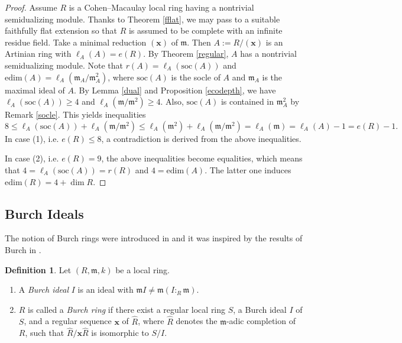\documentclass{amsart}
\newcommand{\m}{\mathfrak{m}}
\theoremstyle{plain}
\theoremstyle{definition}
\newtheorem{definition}[theorem]{Definition}
\numberwithin{theorem}{section}
\numberwithin{equation}{section}
\numberwithin{equation}{theorem}
\begin{document}
\begin{proof}
Assume $R$ is a Cohen--Macaulay local ring having a nontrivial semidualizing module.
Thanks to Theorem \ref{fflat}, we may pass to a suitable faithfully flat extension so that $R$ is assumed to be complete with an infinite residue field.
Take a minimal reduction $(\mathbf{x})$ of $\mathfrak{m}$.
Then $A:=R/(\mathbf{x})$ is an Artinian ring with  $\ell_A(A)=e(R)$.
By Theorem \ref{regular}, $A$ has a nontrivial semidualizing module.
Note that $r(A)=\ell_A(\mathrm{soc}(A))$ and $\mathrm{edim}(A)=\ell_A(\mathfrak{m}_A/\mathfrak{m}_A^2)$, where $\mathrm{soc}(A)$ is the socle of $A$ and $\mathfrak{m}_A$ is the maximal ideal of $A$.
By Lemma \ref{dual} and Proposition \ref{ecodepth}, we have $\ell_A(\mathrm{soc}(A)) \ge 4$ and $\ell_A(\mathfrak{m}/\mathfrak{m}^2)\ge 4$.
Also, $\mathrm{soc}(A)$ is contained in $\mathfrak{m}_A^2$ by Remark \ref{socle}.
This yields inequalities
\[
8 \le \ell_A(\mathrm{soc}(A))+\ell_A(\mathfrak{m}/\mathfrak{m}^2) \le \ell_A(\mathfrak{m}^2)+\ell_A(\mathfrak{m}/\mathfrak{m}^2) = \ell_A(\mathfrak{m})=\ell_A(A)-1=e(R)-1.
\]
In case (1), i.e. $e(R)\le 8$, a contradiction is derived from the above inequalities.

In case (2), i.e. $e(R)=9$, the above inequalities become equalities, which means that $4=\ell_A(\mathrm{soc}(A))=r(R)$ and $4=\mathrm{edim}(A)$.
The latter one induces $\mathrm{edim}(R)=4+\dim R$.
\end{proof}

\subsection{Burch Ideals} 

The notion of Burch rings were introduced in \cite{DKT} and it was inspired by the results of Burch in \cite{B}.  

\begin{definition} \label{defburch}
Let $(R, \m , k)$ be a local ring.
\begin{enumerate}[ \rm(1)]
\item A \emph{Burch ideal} $I$ is an ideal with $\m I \neq \m(I:_R \m)$.
\item $R$ is called a \emph{Burch ring} if there exist a regular local ring $S$, a Burch ideal $I$ of $S$, and a regular sequence $\mathbf{x}$ of $\widehat{R}$, where $\widehat{R}$ denotes the $\m$-adic completion of $R$, such that $\widehat{R}/\mathbf{x}\widehat{R}$ is isomorphic to $S/I$.
\end{enumerate}
\end{definition}
\end{document}
